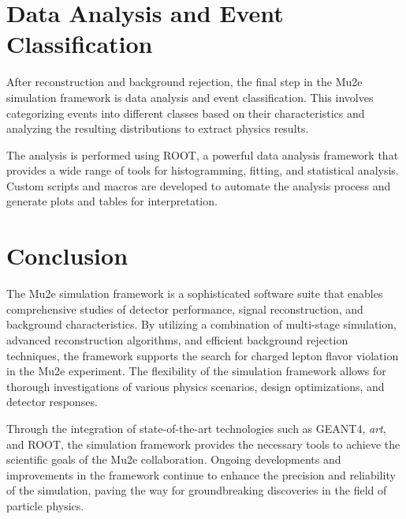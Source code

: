 \section{Data Analysis and Event Classification}

After reconstruction and background rejection, the final step in the Mu2e 
simulation framework is data analysis and event classification. This involves 
categorizing events into different classes based on their characteristics and 
analyzing the resulting distributions to extract physics results.

The analysis is performed using ROOT, a powerful data analysis framework that 
provides a wide range of tools for histogramming, fitting, and statistical analysis. 
Custom scripts and macros are developed to automate the analysis process and generate 
plots and tables for interpretation.

\section{Conclusion}

The Mu2e simulation framework is a sophisticated software suite that enables 
comprehensive studies of detector performance, signal reconstruction, and background 
characteristics. By utilizing a combination of multi-stage simulation, advanced 
reconstruction algorithms, and efficient background rejection techniques, the framework 
supports the search for charged lepton flavor violation in the Mu2e experiment. The flexibility 
of the simulation framework allows for thorough investigations of various physics scenarios, 
design optimizations, and detector responses.

Through the integration of state-of-the-art technologies such as GEANT4, \textit{art}, 
and ROOT, the simulation framework provides the necessary tools to achieve the scientific 
goals of the Mu2e collaboration. Ongoing developments and improvements in the framework 
continue to enhance the precision and reliability of the simulation, paving the way for 
groundbreaking discoveries in the field of particle physics.
